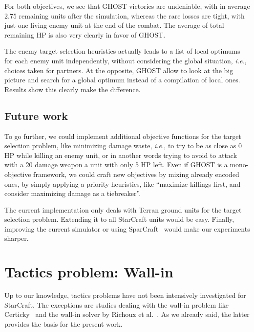 \documentclass[journal]{IEEEtran}
\newcommand{\minormod}[1]{\color{red} #1\color{black} \xspace}
\newcommand{\ghost}{\textsc{GHOST}\xspace}
\newcommand{\ie}{\textit{i.e.}}
\begin{document}
For both objectives, we see that \ghost victories are undeniable, with
in average \minormod{2.75} remaining units after the simulation, whereas the rare
losses are tight, with just one living enemy unit at the end of the
combat. The average of total remaining HP is also very clearly in
favor of \ghost.

\minormod{The enemy target selection heuristics actually leads to a list of local optimums for each enemy unit independently, without considering the global situation, \ie, choices taken for partners. At the opposite, \ghost allow to look at the big picture and search for a global optimum instead of a compilation of local ones. Results show this clearly make the difference.}

\subsection{Future work}

To go further,  we could implement additional  objective functions for
the target  selection problem, like  minimizing damage waste,  \ie, to
try to  be as close  as 0  HP while killing  an enemy unit, or in another
words trying to avoid to attack with a 20 damage weapon a unit with only 5 HP left.   Even if
\ghost is  a mono-objective framework,  we could craft new  objectives by
mixing already encoded ones, by simply applying a priority heuristics,
like ``maximize  killings first, and  consider maximizing damage  as a
tiebreaker''.

The current implementation only deals  with Terran ground units for the
target selection problem.   Extending it to all  StarCraft units would
be easy. Finally,  improving the current simulator  or using SparCraft~\cite{churchill2013sparcraft}
would make our experiments sharper.

\section{Tactics problem: Wall-in}\label{sec:wall}

Up  to  our  knowledge,  tactics  problems  have  not  been  intensively
investigated for StarCraft.
The exceptions are studies dealing with the wall-in problem like
Certicky~\cite{Certicky13} and the wall-in solver by Richoux et
al.~\cite{RichouxUO14}. As we already said, the latter provides the
basis for the present work.
\end{document}
